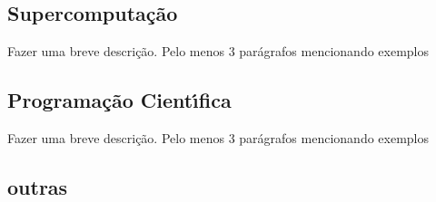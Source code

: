         \subsection{ Supercomputa\c{c}\~{a}o}
        Fazer uma breve descri\c{c}\~{a}o. Pelo menos 3 par\'{a}grafos mencionando exemplos

        \subsection{ Programa\c{c}\~{a}o Cient\'{\i}fica}
        Fazer uma breve descri\c{c}\~{a}o. Pelo menos 3 par\'{a}grafos mencionando exemplos

        \subsection{ outras} 